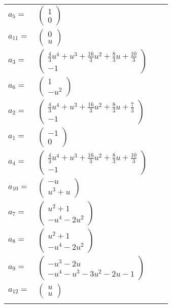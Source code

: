 \documentclass[1p]{elsarticle_modified}
\theoremstyle{definition}
\begin{document}
\begin{tabular}{m{7pt} m{180pt} m{7pt} m{180pt} }
\flushright $a_{5}=$&$\begin{pmatrix}1\\0\end{pmatrix}$ \\
\flushright $a_{11}=$&$\begin{pmatrix}0\\u\end{pmatrix}$ \\
\flushright $a_{3}=$&$\begin{pmatrix}\frac{4}{3} u^4+u^3+\frac{16}{3} u^2+\frac{8}{3} u+\frac{10}{3}\\-1\end{pmatrix}$ \\
\flushright $a_{6}=$&$\begin{pmatrix}1\\- u^2\end{pmatrix}$ \\
\flushright $a_{2}=$&$\begin{pmatrix}\frac{4}{3} u^4+u^3+\frac{16}{3} u^2+\frac{8}{3} u+\frac{7}{3}\\-1\end{pmatrix}$ \\
\flushright $a_{1}=$&$\begin{pmatrix}-1\\0\end{pmatrix}$ \\
\flushright $a_{4}=$&$\begin{pmatrix}\frac{4}{3} u^4+u^3+\frac{16}{3} u^2+\frac{8}{3} u+\frac{10}{3}\\-1\end{pmatrix}$ \\
\flushright $a_{10}=$&$\begin{pmatrix}- u\\u^3+u\end{pmatrix}$ \\
\flushright $a_{7}=$&$\begin{pmatrix}u^2+1\\- u^4-2 u^2\end{pmatrix}$ \\
\flushright $a_{8}=$&$\begin{pmatrix}u^2+1\\- u^4-2 u^2\end{pmatrix}$ \\
\flushright $a_{9}=$&$\begin{pmatrix}- u^3-2 u\\- u^4- u^3-3 u^2-2 u-1\end{pmatrix}$ \\
\flushright $a_{12}=$&$\begin{pmatrix}u\\u\end{pmatrix}$\\&\end{tabular}
\end{document}

